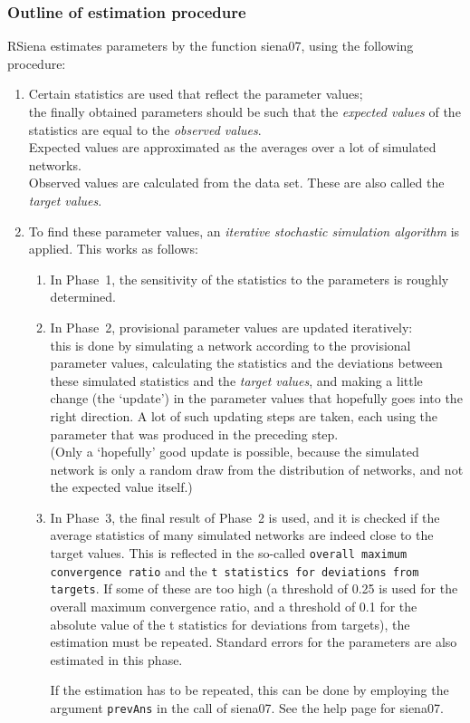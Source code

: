 \documentclass[a4paper,fleqn,11pt]{article}
\newcommand{\+}{\, + \,}
\newcommand{\sfn}[1]{\textsf{#1}}
\newcommand{\RS}{{\sf \textsf{RSiena} }}
\begin{document}
\subsubsection{Outline of estimation procedure}
\label{S_estim}
\noindent
\RS estimates parameters by the function \sfn{siena07},
using the following procedure:
\begin{enumerate}
\item  Certain statistics are used that reflect the parameter values;\\
  the finally obtained parameters should be such that the \emph{expected
    values}
  of the statistics are equal to the \emph{observed values}.\\
  Expected values are approximated as the averages over a lot of simulated
  networks.\\
  Observed values are calculated from the data set. These are also called the
  \emph{target values}.
\item To find these parameter values, an \emph{iterative stochastic simulation
    algorithm}
  is applied.
  This works as follows:
\begin{enumerate}
\item In Phase~1, the sensitivity of the statistics to the parameters is roughly
  determined.
\item In Phase~2, provisional parameter values are updated iteratively:\\
  this is done by simulating a network according to the provisional parameter
  values, calculating the statistics and the deviations between these simulated
  statistics and the \emph{target values}, and making a little change (the
  `update') in the parameter values
  that hopefully goes into the right direction. A lot of such updating steps
  are taken, each using the parameter that was produced in the preceding step.\\
  (Only a `hopefully' good update is possible, because the simulated network is
  only a random draw from the distribution of networks, and not the expected
  value itself.)
\item In Phase~3, the final result of Phase~2 is used, and it is checked if the
  average statistics of many simulated networks are indeed close to the target
  values. This is reflected in the so-called
  \texttt{overall maximum convergence ratio} and the \texttt{t statistics for deviations
  from targets}. If some of these are too high (a threshold of 0.25 is used for the
  overall maximum convergence ratio, and a threshold of 0.1 for the absolute value
  of the t statistics for deviations from targets), the estimation must be repeated.
   Standard errors for the parameters are also estimated in this
  phase.

  If the estimation has to be repeated, this can be done by employing the
  argument \texttt{prevAns} in the call of \sfn{siena07}.
  See the help page for  \sfn{siena07}.
\end{enumerate}
\end{enumerate}
\end{document}
